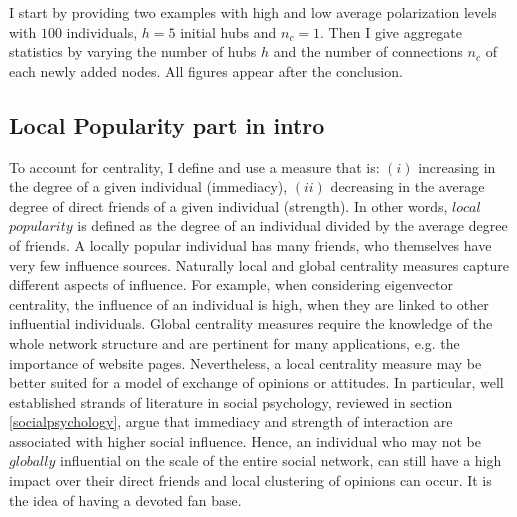 \documentclass{article}
\begin{document}
I start by providing two examples with high and low average polarization levels with $100$ individuals, $h=5$ initial hubs and $n_c=1$. Then I give aggregate statistics by varying the number of hubs $h$ and the number of connections $n_c$ of each newly added nodes. All figures appear after the conclusion.  %
\subsection{Local Popularity part in intro}

To account for centrality, I define and use a measure that is: $(i)$ increasing in the degree of a given individual (immediacy), $(ii)$ decreasing in the average degree of direct friends of a given individual (strength). In other words, $local$ $popularity$ is defined as the degree of an individual divided by the average degree of friends. A locally popular individual has many friends, who themselves have very few influence sources. Naturally local and global centrality measures capture different aspects of influence. For example, when considering eigenvector centrality, the influence of an individual is high, when they are linked to other influential individuals. Global centrality measures require the knowledge of the whole network structure and are pertinent for many applications, e.g. the importance of website pages. Nevertheless, a local centrality measure may be better suited for a model of exchange of opinions or attitudes. In particular, well established strands of literature in social psychology, reviewed in section \ref{socialpsychology}, argue that immediacy and strength of interaction are associated with higher social influence. Hence,  an individual who may not be $globally$ influential on the scale of the entire social network, can still have a high impact over their direct friends and local clustering of opinions can occur. It is the idea of having a devoted fan base.%
\end{document}
